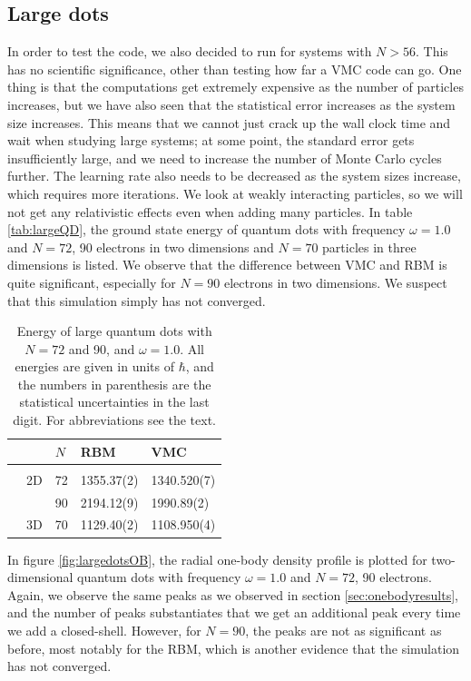 \subsection{Large dots}
In order to test the code, we also decided to run for systems with $N>56$. This has no scientific significance, other than testing how far a VMC code can go. One thing is that the computations get extremely expensive as the number of particles increases, but we have also seen that the statistical error increases as the system size increases. This means that we cannot just crack up the wall clock time and wait when studying large systems; at some point, the standard error gets insufficiently large, and we need to increase the number of Monte Carlo cycles further. The learning rate also needs to be decreased as the system sizes increase, which requires more iterations.  We look at weakly interacting particles, so we will not get any relativistic effects even when adding many particles. In table \eqref{tab:largeQD}, the ground state energy of quantum dots with frequency $\omega=1.0$ and $N=72$, 90 electrons in two dimensions and $N=70$ particles in three dimensions is listed. We observe that the difference between VMC and RBM is quite significant, especially for $N=90$ electrons in two dimensions. We suspect that this simulation simply has not converged. 

\begin{table}
	\caption{Energy of large quantum dots with $N=72$ and 90, and $\omega=1.0$. All energies are given in units of $\hbar$, and the numbers in parenthesis are the statistical uncertainties in the last digit. For abbreviations see the text.}
	\label{tab:largeQD}
	\begin{tabularx}{\textwidth}{R{1.6cm}R{2cm}R{2cm}R{3cm}R{3cm}} \hline\hline
		& \makecell{\\ \phantom{$N$}} & $N$ & RBM & VMC \\ \hline \\
		& 2D & 72 & 1355.37(2) & 1340.520(7) \\
		&& 90 & 2194.12(9) & 1990.89(2) \\
		& 3D & 70 & 1129.40(2) & 1108.950(4) \\
		\hline \hline
	\end{tabularx}
\end{table}

In figure \eqref{fig:largedotsOB}, the radial one-body density profile is plotted for two-dimensional quantum dots with frequency $\omega=1.0$ and $N=72$, 90 electrons. Again, we observe the same peaks as we observed in section \ref{sec:onebodyresults}, and the number of peaks substantiates that we get an additional peak every time we add a closed-shell. However, for $N=90$, the peaks are not as significant as before, most notably for the RBM, which is another evidence that the simulation has not converged.

